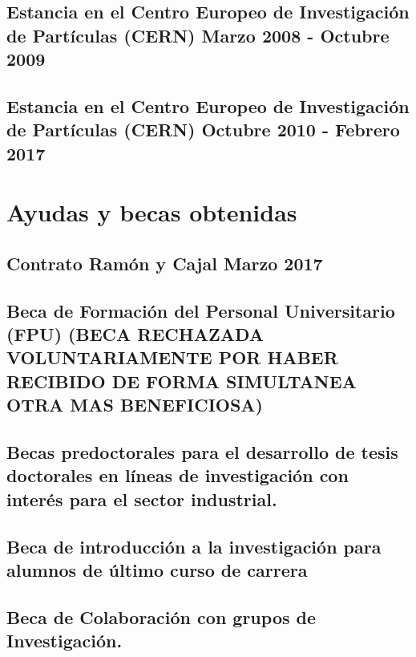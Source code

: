 \documentclass[a4paper, 11pt, twoside, openright]{report}
\begin{document}
\subsection{Estancia en el Centro Europeo de Investigación de Partículas (CERN) Marzo 2008 - Octubre 2009}

\subsection{Estancia en el Centro Europeo de Investigación de Partículas (CERN) Octubre 2010 - Febrero 2017}



\section{Ayudas y becas obtenidas}
\subsection{Contrato Ramón y Cajal Marzo 2017}

\subsection{Beca de Formación del Personal Universitario (FPU) (BECA RECHAZADA VOLUNTARIAMENTE POR HABER RECIBIDO DE FORMA SIMULTANEA OTRA MAS BENEFICIOSA)}

\subsection{Becas predoctorales para el desarrollo de tesis doctorales en líneas de investigación con interés para el sector industrial.}

\subsection{Beca de introducción a la investigación para alumnos de último curso de carrera}

\subsection{Beca de Colaboración con grupos de Investigación.}

\end{document}
